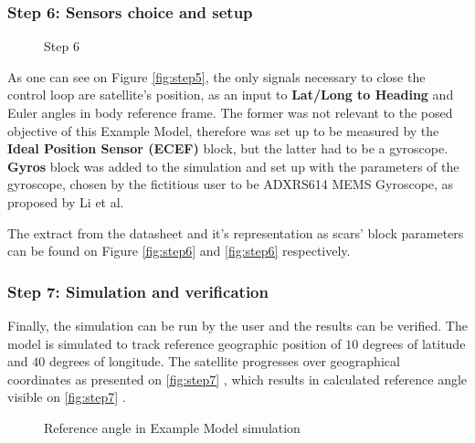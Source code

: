         \subsubsection*{Step 6: Sensors choice and setup}
            \begin{figure}[H]
                \centering
                \qquad
                \caption{Step 6}%
                \label{fig:step6}%
            \end{figure}
            As one can see on Figure \autoref{fig:step5}, the only signals necessary to close the control loop are satellite's position, as an input to \textbf{Lat/Long to Heading} and Euler angles in body reference frame. The former was not relevant to the posed objective of this Example Model, therefore was set up to be measured by the \textbf{Ideal Position Sensor (ECEF)} block, but the latter had to be a gyroscope. \textbf{Gyros} block was added to the simulation and set up with the parameters of the gyroscope, chosen by the fictitious user to be ADXRS614 MEMS Gyroscope, as proposed by Li et al.\cite{li2013design} 
            
            The extract from the datasheet and it's representation as \ac{scars}' block parameters can be found on Figure \autoref{fig:step6}  and \autoref{fig:step6}  respectively.

        \subsubsection*{Step 7: Simulation and verification}
            Finally, the simulation can be run by the user and the results can be verified. The model is simulated to track reference geographic position of $10$ degrees of latitude and $40$ degrees of longitude. The satellite progresses over geographical coordinates as presented on \autoref{fig:step7} , which results in calculated reference angle visible on \autoref{fig:step7} .

            \begin{figure}[H]
                \centering
                \subfloat[Reference angle [rad]{{\texttt{[image: 4-examples/example\_geo.png]}\label{sub:example_geo} }}%
                \qquad
                \subfloat[Reference angle [rad]{{\texttt{[image: 4-examples/example\_ref.png]}\label{sub:example_ref} }}%
                \caption{Reference angle in Example Model simulation}%
                \label{fig:step7}%
            \end{figure}
                         
